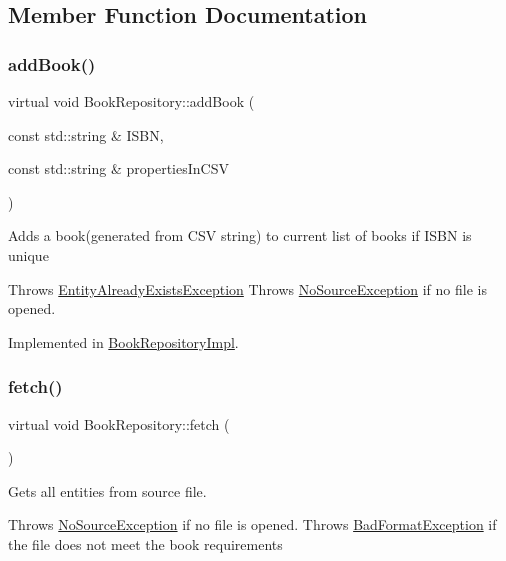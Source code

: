 \subsection{Member Function Documentation}
\mbox{\label{classBookRepository_a3147ce44d65a78bf2c2480639811a55c}} 
\subsubsection{\texorpdfstring{add\+Book()}{addBook()}}
{\footnotesize\ttfamily virtual void Book\+Repository\+::add\+Book (\begin{DoxyParamCaption}\item[{const std\+::string \&}]{I\+S\+BN,  }\item[{const std\+::string \&}]{properties\+In\+C\+SV }\end{DoxyParamCaption})\hspace{0.3cm}{\ttfamily [pure virtual]}}

Adds a book(generated from C\+S\+V string) to current list of books if I\+S\+BN is unique

Throws \hyperlink{structEntityAlreadyExistsException}{Entity\+Already\+Exists\+Exception} Throws \hyperlink{structNoSourceException}{No\+Source\+Exception} if no file is opened. 

Implemented in \hyperlink{classBookRepositoryImpl_a8b9d7df06f6ab11efd72cb32cbfb52fe}{Book\+Repository\+Impl}.

\mbox{\label{classBookRepository_a0019e716ba40e39d2ef01e639347e8f9}} 
\subsubsection{\texorpdfstring{fetch()}{fetch()}}
{\footnotesize\ttfamily virtual void Book\+Repository\+::fetch (\begin{DoxyParamCaption}{ }\end{DoxyParamCaption})\hspace{0.3cm}{\ttfamily [pure virtual]}}

Gets all entities from source file.

Throws \hyperlink{structNoSourceException}{No\+Source\+Exception} if no file is opened. Throws \hyperlink{structBadFormatException}{Bad\+Format\+Exception} if the file does not meet the book requirements 

